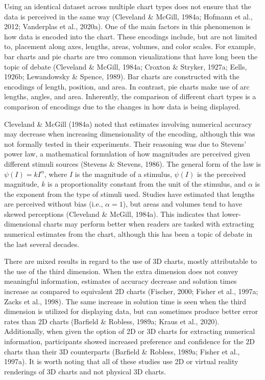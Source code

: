 \documentclass[phd]{nuthesis}
\begin{document}
Using an identical dataset across multiple chart types does not ensure
that the data is perceived in the same way (Cleveland \& McGill, 1984a;
Hofmann et al., 2012; Vanderplas et al., 2020a). One of the main factors
in this phenomenon is how data is encoded into the chart. These
encodings include, but are not limited to, placement along axes,
lengths, areas, volumes, and color scales. For example, bar charts and
pie charts are two common visualizations that have long been the topic
of debate (Cleveland \& McGill, 1984a; Croxton \& Stryker, 1927a; Eells,
1926b; Lewandowsky \& Spence, 1989). Bar charts are constructed with the
encodings of length, position, and area. In contrast, pie charts make
use of arc lengths, angles, and area. Inherently, the comparison of
different chart types is a comparison of encodings due to the changes in
how data is being displayed.

Cleveland \& McGill (1984a) noted that estimates involving numerical
accuracy may decrease when increasing dimensionality of the encoding,
although this was not formally tested in their experiments. Their
reasoning was due to Stevens' power law, a mathematical formulation of
how magnitudes are perceived given different stimuli sources (Stevens \&
Stevens, 1986). The general form of the law is \(\psi(I)=kI^\alpha\),
where \(I\) is the magnitude of a stimulus, \(\psi(I)\) is the perceived
magnitude, \(k\) is a proportionality constant from the unit of the
stimulus, and \(\alpha\) is the exponent from the type of stimuli used.
Studies have estimated that lengths are perceived without bias (i.e.,
\(\alpha=1\)), but areas and volumes tend to have skewed perceptions
(Cleveland \& McGill, 1984a). This indicates that lower-dimensional
charts may perform better when readers are tasked with extracting
numerical estimates from the chart, although this has been a topic of
debate in the last several decades.

There are mixed results in regard to the use of 3D charts, mostly
attributable to the use of the third dimension. When the extra dimension
does not convey meaningful information, estimates of accuracy decrease
and solution times increase as compared to equivalent 2D charts
(Fischer, 2000; Fisher et al., 1997a; Zacks et al., 1998). The same
increase in solution time is seen when the third dimension is utilized
for displaying data, but can sometimes produce better error rates than
2D charts (Barfield \& Robless, 1989a; Kraus et al., 2020).
Additionally, when given the option of 2D or 3D charts for extracting
numerical information, participants showed increased preference and
confidence for the 2D charts than their 3D counterparts (Barfield \&
Robless, 1989a; Fisher et al., 1997a). It is worth noting that all of
these studies use 2D or virtual reality renderings of 3D charts and not
physical 3D charts.
\end{document}

